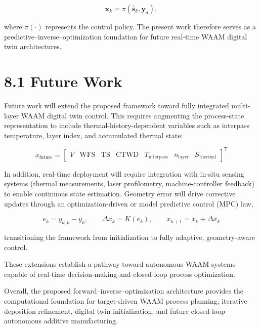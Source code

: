 \documentclass[11pt]{article}
\begin{document}
\begin{equation}
\mathbf{x}_k = \pi(\hat{\mathbf{s}}_k, \mathbf{y}_d),
\end{equation}

where $\pi(\cdot)$ represents the control policy. The present work therefore serves as a predictive--inverse--optimization foundation for future real-time WAAM digital twin architectures.

\section*{8.1 Future Work}

Future work will extend the proposed framework toward fully integrated multi-layer WAAM 
digital twin control. This requires augmenting the process-state representation to include 
thermal-history-dependent variables such as interpass temperature, layer index, and accumulated 
thermal state:


\begin{equation}
\label{eq:123}
\boxed{
x_{\mathrm{future}} =
\begin{bmatrix}
V & \mathrm{WFS} & \mathrm{TS} & \mathrm{CTWD} & T_{\mathrm{interpass}} & n_{\mathrm{layer}} & S_{\mathrm{thermal}}
\end{bmatrix}^{\mathsf{T}}
}
\end{equation}



In addition, real-time deployment will require integration with in-situ sensing systems 
(thermal measurements, laser profilometry, machine-controller feedback) to enable continuous 
state estimation. Geometry error will drive corrective updates through an optimization-driven or 
model predictive control (MPC) law,

\begin{equation}
\label{eq:124}
\boxed{
e_k = y_{d,k} - y_k,\qquad 
\Delta x_k = K(e_k),\qquad 
x_{k+1} = x_k + \Delta x_k
}
\end{equation}



transitioning the framework from initialization to fully adaptive, geometry-aware control.

These extensions establish a pathway toward autonomous WAAM systems capable of real-time 
decision-making and closed-loop process optimization.




Overall, the proposed forward--inverse--optimization architecture provides the computational foundation for target-driven WAAM process planning, iterative deposition refinement, digital twin initialization, and future closed-loop autonomous additive manufacturing.
\end{document}
